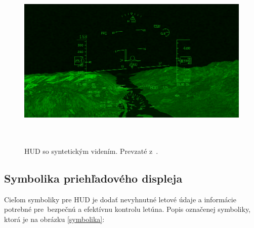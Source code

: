 \begin{itemize}
\begin{figure}[ht]
\includegraphics[height=8cm, width=13cm]{obrazky-figures/HUDs.png}
\caption{HUD so syntetickým videním. Prevzaté z~\cite{fotoSv2}.}{\label{nightHUD}}
\end{figure}
\end{itemize}

\subsection{Symbolika priehľadového displeja}
Cieľom symboliky pre HUD je  dodať nevyhnutné letové údaje a informácie potrebné pre~bezpečnú a efektívnu kontrolu letúna. Popis označenej symboliky, ktorá je na obrázku \ref{symbolika}:

